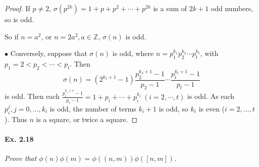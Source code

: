 \documentclass[11pt,a4paper]{article}
\newcommand{\Z}{\mathbb{Z}}
\begin{document}
{\begin{proof}
If $p \ne 2$, $\sigma(p^{2k}) = 1 + p + p^2+\cdots+p^{2k}$ is a sum of $2k+1$ odd numbers, so is odd.

So if $n = a^2$, or $n = 2a^2 ,a \in \Z$, $\sigma(n)$ is odd.

$\bullet$ Conversely, suppose that $\sigma(n)$ is odd, where $n = p_1^{k_1} p_2^{k_2}\cdots p_t^{k_t}$, with $p_1=2 < p_2 < \cdots < p_t$. 
Then $$\sigma(n) = (2^{k_1+1} - 1) \frac{p_2^{k_2+1} - 1}{p_2-1} \cdots  \frac{p_t^{k_t+1} - 1}{p_t-1}$$
is odd. Then each $\frac{p_i^{k_i+1} - 1}{p_i-1} = 1+p_i + \cdots+p_i^{k_i}\ (i=2,\cdots,t)$ is odd. As each $p_i^j, j=0,\ldots,k_i$ is odd, the number of terms $k_i+1$ is odd, so $k_i$ is even ($i = 2,\ldots,t$). Thus $n$ is a square, or twice a square.
\end{proof}

\paragraph{Ex. 2.18}

{\it Prove that $\phi(n)\phi(m) = \phi((n, m))\phi([n, m])$.
}

}
\end{document}
